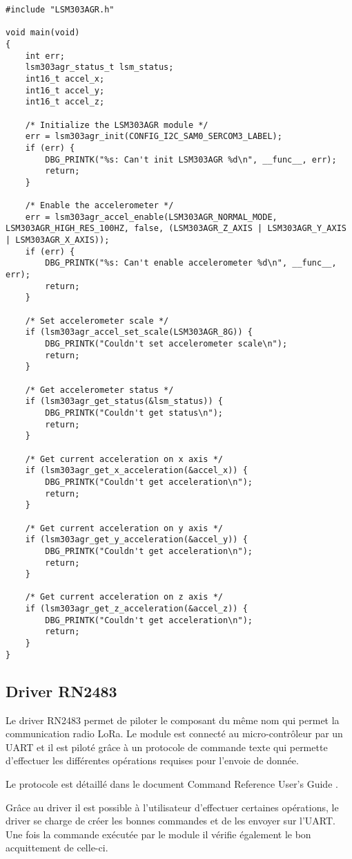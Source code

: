 \begin{lstlisting}[style=CStyle]
#include "LSM303AGR.h"

void main(void)
{
	int err;
	lsm303agr_status_t lsm_status;
	int16_t accel_x;
	int16_t accel_y;
	int16_t accel_z;

	/* Initialize the LSM303AGR module */
	err = lsm303agr_init(CONFIG_I2C_SAM0_SERCOM3_LABEL);
	if (err) {
		DBG_PRINTK("%s: Can't init LSM303AGR %d\n", __func__, err);
		return;
	}

	/* Enable the accelerometer */
	err = lsm303agr_accel_enable(LSM303AGR_NORMAL_MODE, LSM303AGR_HIGH_RES_100HZ, false, (LSM303AGR_Z_AXIS | LSM303AGR_Y_AXIS | LSM303AGR_X_AXIS));
	if (err) {
		DBG_PRINTK("%s: Can't enable accelerometer %d\n", __func__, err);
		return;
	}

	/* Set accelerometer scale */
	if (lsm303agr_accel_set_scale(LSM303AGR_8G)) {
		DBG_PRINTK("Couldn't set accelerometer scale\n");
		return;
	}
	
	/* Get accelerometer status */
	if (lsm303agr_get_status(&lsm_status)) {
		DBG_PRINTK("Couldn't get status\n");
		return;	
	}
	
	/* Get current acceleration on x axis */	
	if (lsm303agr_get_x_acceleration(&accel_x)) {
		DBG_PRINTK("Couldn't get acceleration\n");
		return;		
	}

	/* Get current acceleration on y axis */	
	if (lsm303agr_get_y_acceleration(&accel_y)) {
		DBG_PRINTK("Couldn't get acceleration\n");
		return;		
	}
	
	/* Get current acceleration on z axis */	
	if (lsm303agr_get_z_acceleration(&accel_z)) {
		DBG_PRINTK("Couldn't get acceleration\n");
		return;		
	}	
}
\end{lstlisting}

\subsection{Driver RN2483}

Le driver RN2483 permet de piloter le composant du même nom qui permet la communication radio LoRa. Le module est connecté au micro-contrôleur par un UART et il est piloté grâce à un protocole de commande texte qui permette d'effectuer les différentes opérations requises pour l'envoie de donnée.

Le protocole est détaillé dans le document Command Reference User's Guide \cite{rn2483-datasheet}.

Grâce au driver il est possible à l'utilisateur d'effectuer certaines opérations, le driver se charge de créer les bonnes commandes et de les envoyer sur l'UART. Une fois la commande exécutée par le module il vérifie également le bon acquittement de celle-ci.

